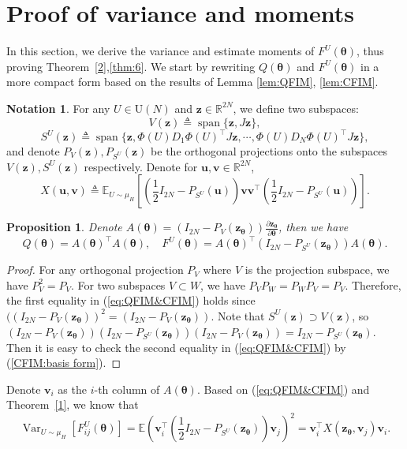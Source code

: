 \documentclass{amsart}
\theoremstyle{plain}
\newtheorem{prop}[theorem]{Proposition}
\theoremstyle{definition}
\newtheorem*{notation}{Notation}
\theoremstyle{remark}
\DeclareMathOperator{\spanop}{span}
\newcommand{\thmref}[1]{Theorem~\ref{#1}}
\newcommand{\RR}{\mathbb{R}}
\newcommand{\EE}{\mathbb{E}}
\DeclareMathOperator{\var}{Var}
\begin{document}
\section{Proof of variance and moments}\label{sec:variance}
In this section, we derive the variance and estimate moments of $F^U(\bm\theta)$, thus proving \thmref{2},\ref{thm:6}. We start by rewriting $Q(\bm\theta)$ and $F^U(\bm\theta)$ in a more compact form based on the results of Lemma \ref{lem:QFIM}, \ref{lem:CFIM}.
\begin{notation}
     For any $U\in \mathrm U(N)$ and $\bm z\in\RR^{2N}$, we define two subspaces:
    \[V(\bm{z}) \triangleq \spanop \{\bm{z},J\bm{z}\},\] 
    \[S^U(\bm{z}) \triangleq \spanop \{\bm z,\Phi(U)D_1\Phi(U)^\top J\bm{z},\cdots,\Phi(U) D_N\Phi(U)^\top J\bm{z}\},\]
    and denote $P_{V}(\bm z),P_{S^U}(\bm z)$ be the orthogonal projections onto the subspaces $V(\bm{z}),S^U(\bm{z})$ respectively. Denote for $\bm u,\bm v\in\RR^{2N}$, 
    \begin{equation*}
    X(\bm u,\bm v) \triangleq \EE_{U\sim\mu_H}[(\frac{1}{2}I_{2N}-P_{S^U}(\bm u))\bm v\bm v^\top(\frac{1}{2}I_{2N}-P_{S^U}(\bm u))].
    \end{equation*}
\end{notation}
\begin{prop}
    Denote $A(\bm\theta)=(I_{2N}-P_V(\bm z_{\bm\theta}))\frac{\partial\bm z_{\bm\theta}}{\partial\bm\theta}$, then we have 
    \begin{equation}
        \label{eq:QFIM&CFIM}
        Q(\bm\theta)=A(\bm\theta)^\top A(\bm\theta),\quad F^U(\bm\theta)=A(\bm\theta)^\top (I_{2N}-P_{S^U}(\bm z_{\bm\theta}))A(\bm\theta).
    \end{equation}
\end{prop}
\begin{proof}
    For any orthogonal projection $P_V$ where $V$ is the projection subspace, we have $P^2_V=P_V$. For two subspaces $V\subset W$, we have $P_VP_W=P_WP_V=P_{V}$. Therefore, the first equality in (\ref{eq:QFIM&CFIM}) holds since $((I_{2N}-P_V(\bm z_{\bm\theta}))^2=(I_{2N}-P_V(\bm z_{\bm\theta}))$. Note that $S^U(\bm z)\supset V(\bm z)$, so $(I_{2N}-P_V(\bm z_{\bm\theta}))(I_{2N}-P_{S^U}(\bm z_{\bm\theta}))(I_{2N}-P_V(\bm z_{\bm\theta}))=I_{2N}-P_{S^U}(\bm z_{\bm\theta})$. Then it is easy to check the second equality in (\ref{eq:QFIM&CFIM}) by (\ref{CFIM:basis form}).
\end{proof}
Denote $\bm v_i$ as the $i$-th column of $A(\bm\theta)$. Based on (\ref{eq:QFIM&CFIM}) and \thmref{1}, we know that
\begin{equation}
    \label{eq:Variance}
    \var_{U\sim\mu_H}[F_{ij}^U(\bm\theta)]= \EE \left(\bm v_i^\top (\frac{1}{2}I_{2N}-P_{S^U}(\bm z_{\bm\theta}))\bm v_j\right)^2=\bm v_i^\top X(\bm z_{\bm\theta},\bm v_j)\bm v_i.
\end{equation}
\end{document}
